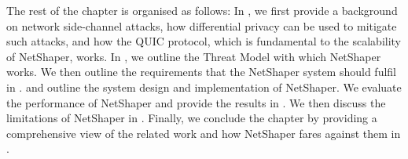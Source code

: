 The rest of the chapter is organised as follows:
In , we first provide a background on network side-channel attacks, how differential privacy can be used to mitigate such attacks, and how the QUIC protocol, which is fundamental to the scalability of NetShaper, works.
In , we outline the Threat Model with which NetShaper works.
We then outline the requirements that the NetShaper system should fulfil in .
 and  outline the system design and implementation of NetShaper.
We evaluate the performance of NetShaper and provide the results in .
We then discuss the limitations of NetShaper in .
Finally, we conclude the chapter by providing a comprehensive view of the related work and how NetShaper fares against them in .